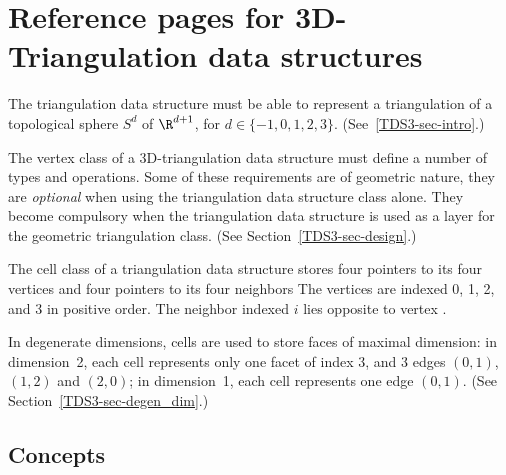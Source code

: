 \clearpage
\section{Reference pages for 3D-Triangulation data structures}

The triangulation data structure must be able to represent a
triangulation of a topological sphere $S^d$ of $\R^{d+1}$, for 
$d \in \{-1,0,1,2,3\}$. (See~\ref{TDS3-sec-intro}.)

The vertex class of a 3D-triangulation data structure must define
a number of types and operations. Some of these
requirements are of geometric nature, they are \textit{optional}
when using the triangulation data structure class alone. They become
compulsory when the triangulation data structure is used as a layer
for the geometric triangulation class. (See Section~\ref{TDS3-sec-design}.)

The cell class of a triangulation data structure stores
four pointers to its four vertices and four pointers to its four
neighbors The vertices are indexed 0, 1, 2, and 3 in positive order.
The neighbor indexed $i$ lies opposite to vertex .

In degenerate dimensions, cells are used to store faces of maximal
dimension: in dimension~2, each cell represents only one
facet of index 3, and 3 edges $(0,1)$, $(1,2)$ and $(2,0)$; in
dimension~1, each cell represents one edge $(0,1)$. (See 
Section~\ref{TDS3-sec-degen_dim}.) 

\subsection*{Concepts}


\\


